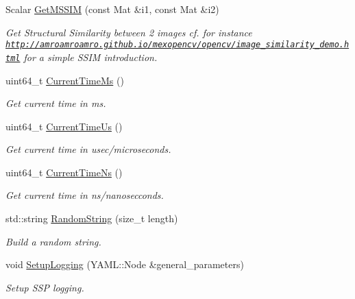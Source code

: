 \begin{DoxyCompactItemize}
Scalar \hyperlink{namespacemoetsi_1_1ssp_ae44d43d11d27495335b5494d0cff7601}{Get\+M\+S\+S\+IM} (const Mat \&i1, const Mat \&i2)
\begin{DoxyCompactList}\small\item\em Get Structural Similarity between 2 images cf. for instance \href{http://amroamroamro.github.io/mexopencv/opencv/image_similarity_demo.html}{\tt http\+://amroamroamro.\+github.\+io/mexopencv/opencv/image\+\_\+similarity\+\_\+demo.\+html} for a simple S\+S\+IM introduction. \end{DoxyCompactList}\item 
uint64\+\_\+t \hyperlink{namespacemoetsi_1_1ssp_a3aaefb86d19ad4cca7f0db6c37682195}{Current\+Time\+Ms} ()
\begin{DoxyCompactList}\small\item\em Get current time in ms. \end{DoxyCompactList}\item 
uint64\+\_\+t \hyperlink{namespacemoetsi_1_1ssp_ad7107897c233642c927f0129f2aea2e0}{Current\+Time\+Us} ()
\begin{DoxyCompactList}\small\item\em Get current time in usec/microseconds. \end{DoxyCompactList}\item 
uint64\+\_\+t \hyperlink{namespacemoetsi_1_1ssp_ae09a8f6b1d89b0bdb6eec602dd581192}{Current\+Time\+Ns} ()
\begin{DoxyCompactList}\small\item\em Get current time in ns/nanosecconds. \end{DoxyCompactList}\item 
\mbox{\label{namespacemoetsi_1_1ssp_ac615e71e018ead7a1598be1b67079f93}} 
std\+::string \hyperlink{namespacemoetsi_1_1ssp_ac615e71e018ead7a1598be1b67079f93}{Random\+String} (size\+\_\+t length)
\begin{DoxyCompactList}\small\item\em Build a random string. \end{DoxyCompactList}\item 
void \hyperlink{namespacemoetsi_1_1ssp_a732d178071710fdceab189671f2d7c25}{Setup\+Logging} (Y\+A\+M\+L\+::\+Node \&general\+\_\+parameters)
\begin{DoxyCompactList}\small\item\em Setup S\+SP logging. \end{DoxyCompactList}\item 

\end{DoxyCompactItemize}
